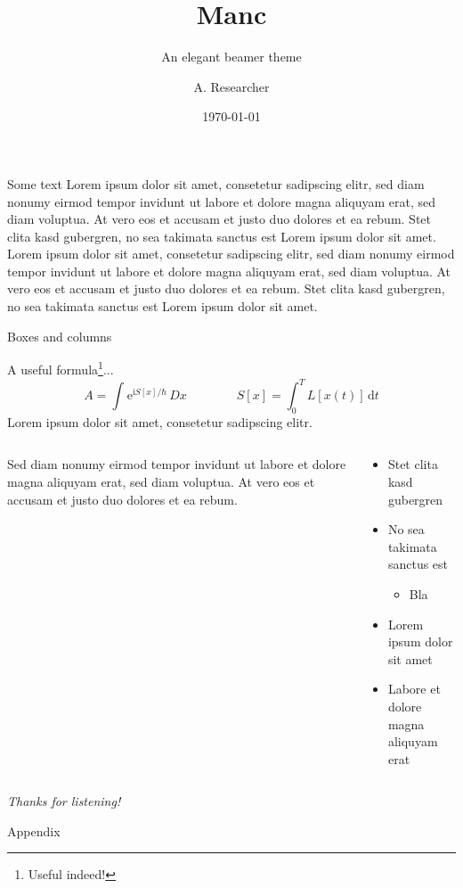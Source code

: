 \documentclass[compress,aspectratio=1610]{beamer}
\title{Manc}
\subtitle{An elegant beamer theme}
\date{\today}
\author[Researcher]{A. Researcher\footnotemark[1]}
\institute{\footnotemark[1]\texttt{mymail@myuniversity.edu}}
\begin{document}
\maketitle

\begin{frame}{Some text}
	Lorem ipsum dolor sit amet, consetetur sadipscing elitr, sed diam nonumy eirmod tempor invidunt ut labore et dolore magna aliquyam erat, sed diam voluptua. At vero eos et accusam et justo duo dolores et ea rebum. Stet clita kasd gubergren, no sea takimata sanctus est Lorem ipsum dolor sit amet. Lorem  ipsum dolor sit amet, consetetur sadipscing elitr, sed diam nonumy eirmod tempor invidunt ut labore et dolore magna aliquyam erat, sed diam voluptua. At vero eos et accusam et justo duo dolores et ea rebum. Stet clita kasd gubergren, no sea takimata sanctus est Lorem ipsum dolor sit amet.
\end{frame}

\begin{frame}{Boxes and columns}
  \begin{block}{A useful formula\footnote[frame]{Useful indeed!}...}
    \begin{equation*}
      A = \int^{}\mathrm{e}^{\mathrm{i} S[x] / \hbar}\,Dx \hspace{4em} S[x] = \int^{T}_0 L[x(t)]\,\mathrm{d}t
    \end{equation*}
    \centering
Lorem ipsum dolor sit amet, consetetur sadipscing elitr.
  \end{block}
  \begin{columns}
    \begin{column}{0.5\textwidth}
      Sed diam nonumy eirmod tempor invidunt ut labore et dolore magna aliquyam erat, sed diam voluptua. At vero eos et accusam et justo duo dolores et ea rebum.
    \end{column}
    \begin{column}{0.5\textwidth}
      \begin{itemize}
        \item Stet clita kasd gubergren
        \item No sea takimata sanctus est
          \begin{itemize}
            \item Bla
          \end{itemize}
        \item Lorem ipsum dolor sit amet
        \item Labore et dolore magna aliquyam erat
      \end{itemize}
    \end{column}
  \end{columns}
\end{frame}

\begin{darkframe}
  \centering
  \textit{Thanks for listening!}
\end{darkframe}

\appendix
\begin{darkframe}
  \centering
   Appendix
\end{darkframe}
\end{document}
